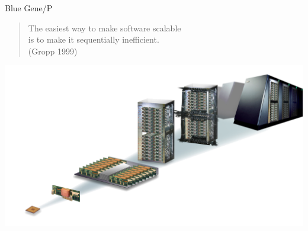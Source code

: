 \begin{frame}{Blue Gene/P}
    \begin{quote}\large \centering
    The easiest way to make software scalable \\
    is to make it sequentially inefficient. \\
    (Gropp 1999)
  \end{quote}

  \includegraphics[width=\textwidth]{figures/BlueGenePRacks}
\end{frame}
